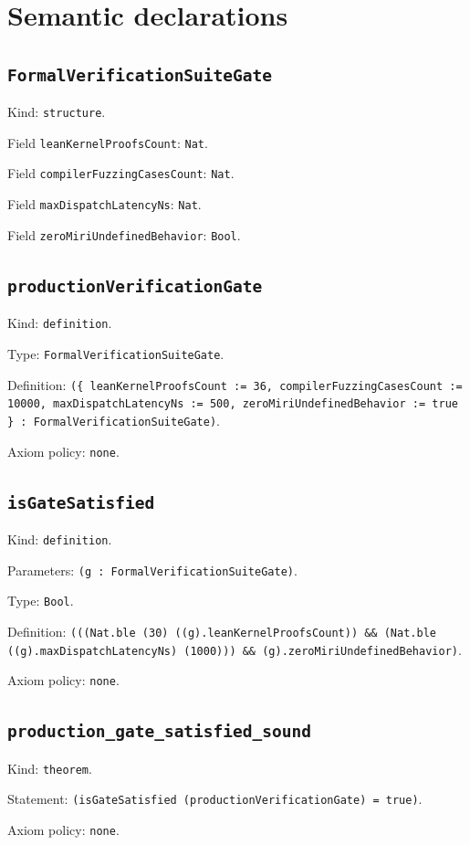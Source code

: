 \documentclass[11pt]{article}
\begin{document}
\section*{Semantic declarations}
\subsection*{\texttt{FormalVerificationSuiteGate}}
\noindent Kind: \texttt{structure}.\par
\noindent Field \texttt{leanKernelProofsCount}: \texttt{Nat}.\par
\noindent Field \texttt{compilerFuzzingCasesCount}: \texttt{Nat}.\par
\noindent Field \texttt{maxDispatchLatencyNs}: \texttt{Nat}.\par
\noindent Field \texttt{zeroMiriUndefinedBehavior}: \texttt{Bool}.\par
\subsection*{\texttt{productionVerificationGate}}
\noindent Kind: \texttt{definition}.\par
\noindent Type: \texttt{FormalVerificationSuiteGate}.\par
\noindent Definition: \texttt{(\{ leanKernelProofsCount := 36, compilerFuzzingCasesCount := 10000, maxDispatchLatencyNs := 500, zeroMiriUndefinedBehavior := true \} : FormalVerificationSuiteGate)}.\par
\noindent Axiom policy: \texttt{none}.\par
\subsection*{\texttt{isGateSatisfied}}
\noindent Kind: \texttt{definition}.\par
\noindent Parameters: \texttt{(g : FormalVerificationSuiteGate)}.\par
\noindent Type: \texttt{Bool}.\par
\noindent Definition: \texttt{(((Nat.ble (30) ((g).leanKernelProofsCount)) \&\& (Nat.ble ((g).maxDispatchLatencyNs) (1000))) \&\& (g).zeroMiriUndefinedBehavior)}.\par
\noindent Axiom policy: \texttt{none}.\par
\subsection*{\texttt{production\_gate\_satisfied\_sound}}
\noindent Kind: \texttt{theorem}.\par
\noindent Statement: \texttt{(isGateSatisfied (productionVerificationGate) = true)}.\par
\noindent Axiom policy: \texttt{none}.\par
\end{document}
